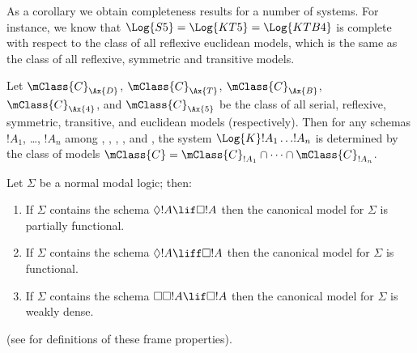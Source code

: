 \documentclass[../../../include/open-logic-section]{subfiles}
\begin{document}
As a corollary we obtain completeness results for a number of
systems. For instance, we know that $\Log{S5} = \Log{KT5} =
\Log{KTB4}$ is complete with respect to the class of all reflexive
euclidean models, which is the same as the class of all reflexive,
symmetric and transitive models.

\begin{thm}
  Let $\mClass{C}_\Ax{D}$, $\mClass{C}_\Ax{T}$,
  $\mClass{C}_\Ax{B}$, $\mClass{C}_\Ax{4}$, and
  $\mClass{C}_\Ax{5}$ be the class of all serial, reflexive,
  symmetric, transitive, and euclidean models (respectively). Then for
  any schemas $!A_1$, \dots, $!A_n$ among ,
  , , , and , the system
  $\Log{K}!A_1 \dots !A_n$ is determined by the
  class of models $\mClass{C} = \mClass{C}_{!A_1} \cap \dots
  \cap \mClass{C}_{!A_n}$. 
\end{thm}

\begin{prop}
  Let $\Sigma$ be a normal modal logic; then:
  \begin{enumerate}
  \item{}%
    If $\Sigma$ contains the schema $\Diamond!A \lif \Box 
    !A$ then the canonical model for $\Sigma$ is partially functional. 
  \item If $\Sigma$ contains the schema $\Diamond!A \liff \Box 
    !A$ then the canonical model for $\Sigma$ is functional. 
  \item If $\Sigma$ contains the schema $\Box\Box!A \lif \Box 
    !A$ then the canonical model for $\Sigma$ is weakly dense. 
  \end{enumerate}
(see  for definitions of these frame
  properties).
\end{prop}
\end{document}
